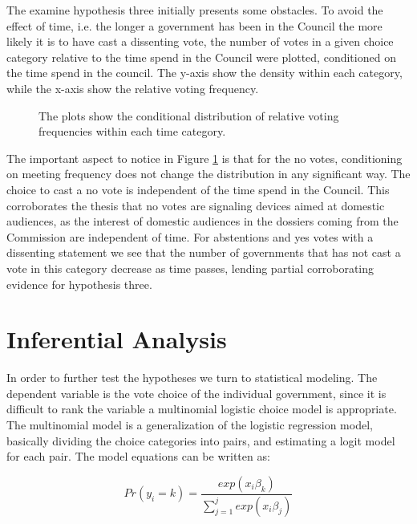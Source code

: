 The examine hypothesis three initially presents some obstacles. To avoid the effect of time, i.e. the longer a government has been in the Council the more likely it is to have cast a dissenting vote, the number of votes in a given choice category relative to the time spend in the Council were plotted, conditioned on the time spend in the council. The y-axis show the density within each category, while the x-axis show the relative voting frequency.

 
\begin{figure}[htp]
\centering
\scalebox{.6}{\subfloat[][No Votes]{}}\quad
\scalebox{.6}{\subfloat[][Abstentions]{}}\quad
{}\quad
\caption{The plots show the conditional distribution of relative voting frequencies within each time category.}
\label{fig:histogram}
\end{figure}

The important aspect to notice in Figure \ref{fig:histogram} is that for the no votes, conditioning on meeting frequency does not change the distribution in any significant way. The choice to cast a no vote is independent of the time spend in the Council. This corroborates the thesis that no votes are signaling devices aimed at domestic audiences, as the interest of domestic audiences in the dossiers coming from the Commission are independent of time. For abstentions and yes votes with a dissenting statement we see that the number of governments that has not cast a vote in this category decrease as time passes, lending partial corroborating evidence for hypothesis three.




\section{Inferential Analysis}
In order to further test the hypotheses we turn to statistical modeling. The dependent variable is the vote choice of the individual government, since it is difficult to rank the variable a multinomial logistic choice model is appropriate. The multinomial model is a generalization of the logistic regression model, basically dividing the choice categories into pairs, and estimating a logit model for each pair. The model equations can be written as:

\begin{equation}
  \label{eq:3}
  Pr(y_i = k) = \frac{exp(x_i\beta_k)}{\sum_{j = 1}^j exp(x_i \beta_j)}
\end{equation}

